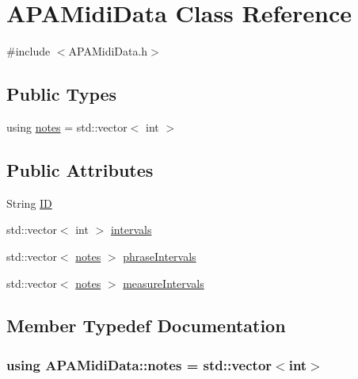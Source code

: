 \hypertarget{class_a_p_a_midi_data}{\section{A\+P\+A\+Midi\+Data Class Reference}
\label{class_a_p_a_midi_data}
}


{\ttfamily \#include $<$A\+P\+A\+Midi\+Data.\+h$>$}

\subsection*{Public Types}
\begin{DoxyCompactItemize}
\item 
using \hyperlink{class_a_p_a_midi_data_a5d20f609cfadb2b081f81da61840a473}{notes} = std\+::vector$<$ int $>$
\end{DoxyCompactItemize}
\subsection*{Public Attributes}
\begin{DoxyCompactItemize}
\item 
String \hyperlink{class_a_p_a_midi_data_ae8027131ba55c8755f452ddff07fb614}{I\+D}
\item 
std\+::vector$<$ int $>$ \hyperlink{class_a_p_a_midi_data_a449871212e64922701a7ae9191e3a013}{intervals}
\item 
std\+::vector$<$ \hyperlink{class_a_p_a_midi_data_a5d20f609cfadb2b081f81da61840a473}{notes} $>$ \hyperlink{class_a_p_a_midi_data_a281995e0adb7efdd2df91deb7c327d57}{phrase\+Intervals}
\item 
std\+::vector$<$ \hyperlink{class_a_p_a_midi_data_a5d20f609cfadb2b081f81da61840a473}{notes} $>$ \hyperlink{class_a_p_a_midi_data_a8b8b037cc91565601098df0a432c7619}{measure\+Intervals}
\end{DoxyCompactItemize}


\subsection{Member Typedef Documentation}
\hypertarget{class_a_p_a_midi_data_a5d20f609cfadb2b081f81da61840a473}{
\subsubsection[{notes}]{\setlength{\rightskip}{0pt plus 5cm}using {\bf A\+P\+A\+Midi\+Data\+::notes} =  std\+::vector$<$int$>$}}\label{class_a_p_a_midi_data_a5d20f609cfadb2b081f81da61840a473}


